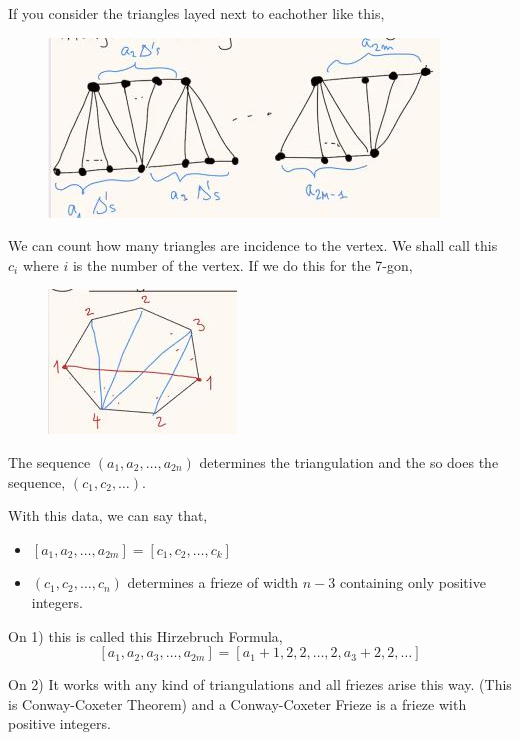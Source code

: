 \documentclass{article}
\begin{document}
If you consider the triangles layed next to eachother like this,
\begin{figure}[!ht]
  \centering
  \includegraphics{./figures/L1.2}
  \caption{}
  \label{}
\end{figure}
We can count how many triangles are incidence to the vertex. We shall call this $c_i$ where $i$ is the number of the vertex. If we do this for the 7-gon,
\begin{figure}[!ht]
  \centering
  \includegraphics{./figures/L1.3}
  \caption{}
  \label{}
\end{figure}
The sequence $(a_1, a_2, \dots, a_{2n})$ determines the triangulation and the so does the sequence, $(c_1, c_2, \dots)$.

\begin{nthm}
  With this data, we can say that,
  \begin{itemize}
    \item $[a_1, a_2, \dots, a_{2m}] = \![ c_1, c_2, \dots, c_k \!]$
    \item $(c_1, c_2, \dots, c_n)$ determines a frieze of width $n-3$ containing only positive integers.
  \end{itemize}
\end{nthm}

\begin{remark}
  On 1) this is called this Hirzebruch Formula,
  $$ [a_1, a_2, a_3, \dots, a_{2m}] = \![ a_1+1, 2, 2, \dots, 2, a_3+2, 2, \dots \!] $$
\end{remark}

\begin{remark}
  On 2) It works with any kind of triangulations and all friezes arise this way. (This is Conway-Coxeter Theorem) and a Conway-Coxeter Frieze is a frieze with positive integers.
\end{remark}
\end{document}
